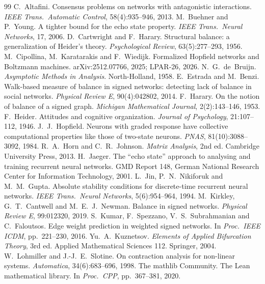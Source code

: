\documentclass[11pt]{article}
\theoremstyle{definition}
\theoremstyle{remark}
\begin{document}
\begin{thebibliography}{99}\small
{} C.~Altafini. Consensus problems on networks with antagonistic interactions.
  \emph{IEEE Trans.\ Automatic Control}, 58(4):935--946, 2013.
 M.~Buehner and P.~Young. A tighter bound for the echo state property.
  \emph{IEEE Trans.\ Neural Networks}, 17, 2006.
 D.~Cartwright and F.~Harary. Structural balance: a generalization of Heider's theory.
  \emph{Psychological Review}, 63(5):277--293, 1956.
 M.~Cipollina, M.~Karatarakis and F.~Wiedijk. Formalized Hopfield networks and
  Boltzmann machines. arXiv:2512.07766, 2025; LPAR-26, 2026.
 N.~G.~de~Bruijn. \emph{Asymptotic Methods in Analysis}. North-Holland, 1958.
 E.~Estrada and M.~Benzi. Walk-based measure of balance in signed networks:
  detecting lack of balance in social networks. \emph{Physical Review E}, 90(4):042802, 2014.
 F.~Harary. On the notion of balance of a signed graph.
  \emph{Michigan Mathematical Journal}, 2(2):143--146, 1953.
 F.~Heider. Attitudes and cognitive organization.
  \emph{Journal of Psychology}, 21:107--112, 1946.
 J.~J.~Hopfield. Neurons with graded response have collective computational
  properties like those of two-state neurons. \emph{PNAS}, 81(10):3088--3092, 1984.
 R.~A.~Horn and C.~R.~Johnson. \emph{Matrix Analysis}, 2nd ed. Cambridge University Press, 2013.
 H.~Jaeger. The ``echo state'' approach to analysing and training recurrent neural
  networks. GMD Report 148, German National Research Center for Information Technology, 2001.
 L.~Jin, P.~N.~Nikiforuk and M.~M.~Gupta. Absolute stability conditions for discrete-time
  recurrent neural networks. \emph{IEEE Trans.\ Neural Networks}, 5(6):954--964, 1994.
 M.~Kirkley, G.~T.~Cantwell and M.~E.~J.~Newman. Balance in signed networks.
  \emph{Physical Review E}, 99:012320, 2019.
 S.~Kumar, F.~Spezzano, V.~S.~Subrahmanian and C.~Faloutsos. Edge weight prediction in
  weighted signed networks. In \emph{Proc.\ IEEE ICDM}, pp.~221--230, 2016.
 Yu.~A.~Kuznetsov. \emph{Elements of Applied Bifurcation Theory}, 3rd ed.
  Applied Mathematical Sciences 112. Springer, 2004.
 W.~Lohmiller and J.-J.~E.~Slotine. On contraction analysis for non-linear systems.
  \emph{Automatica}, 34(6):683--696, 1998.
 The mathlib Community. The Lean mathematical library. In \emph{Proc.\ CPP}, pp.~367--381, 2020.

\end{thebibliography}
\end{document}

